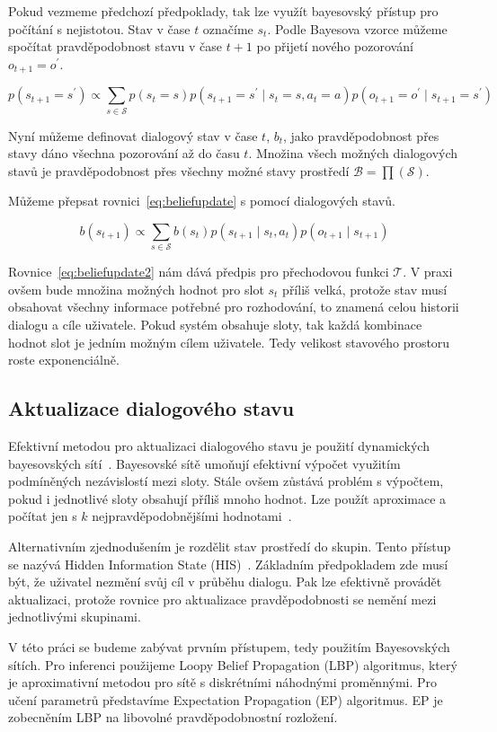 Pokud vezmeme předchozí předpoklady, tak lze využít bayesovský přístup pro počítání s nejistotou.
Stav v čase $t$ označíme $s_t$.
Podle Bayesova vzorce můžeme spočítat pravděpodobnost stavu v čase $t+1$ po přijetí nového pozorování $o_{t+1} = o^\prime$.

\begin{equation}
p(s_{t+1} = s^\prime) \propto
    \sum_{s \in \mathcal{S}}
        p(s_t = s)
        p(s_{t+1} = s^\prime \mid s_t = s, a_t = a) p(o_{t+1} = o^\prime \mid s_{t+1} = s^\prime)
\label{eq:beliefupdate}
\end{equation}

Nyní můžeme definovat dialogový stav v čase $t$, $b_t$, jako pravděpodobnost přes stavy dáno všechna pozorování až do času $t$.
Množina všech možných dialogových stavů je pravděpodobnost přes všechny možné stavy prostředí $\mathcal{B} = \prod(\mathcal{S})$.

Můžeme přepsat rovnici~\eqref{eq:beliefupdate} s pomocí dialogových stavů.

\begin{equation}
b(s_{t+1}) \propto
    \sum_{s \in \mathcal{S}}
        b(s_t)
        p(s_{t+1} \mid s_t, a_t)
        p(o_{t+1} \mid s_{t+1})
\label{eq:beliefupdate2}
\end{equation}

Rovnice~\eqref{eq:beliefupdate2} nám dává předpis pro přechodovou funkci $\mathcal{T}$.
V praxi ovšem bude množina možných hodnot pro slot $s_t$ příliš velká, protože stav musí obsahovat všechny informace potřebné pro rozhodování, to znamená celou historii dialogu a cíle uživatele. 
Pokud systém obsahuje sloty, tak každá kombinace hodnot slot je jedním možným cílem uživatele. 
Tedy velikost stavového prostoru roste exponenciálně.

\subsection{Aktualizace dialogového stavu}

Efektivní metodou pro aktualizaci dialogového stavu je použití dynamických bayesovských sítí~\cite{thomson2008bayesian}.
Bayesovské sítě umoňují efektivní výpočet využitím podmíněných nezávislostí mezi sloty.
Stále ovšem zůstává problém s výpočtem, pokud i jednotlivé sloty obsahují příliš mnoho hodnot.
Lze použít aproximace a počítat jen s $k$ nejpravděpodobnějšími hodnotami~\cite{thomson2010bayesian}.

Alternativním zjednodušením je rozdělit stav prostředí do skupin. 
Tento přístup se nazývá Hidden Information State (HIS)~\cite{young2010hidden}.
Základním předpokladem zde musí být, že uživatel nezmění svůj cíl v průběhu dialogu.
Pak lze efektivně provádět aktualizaci, protože rovnice pro aktualizace pravděpodobnosti se nemění mezi jednotlivými skupinami.

V této práci se budeme zabývat prvním přístupem, tedy použitím Bayesovských sítích.
Pro inferenci použijeme Loopy Belief Propagation (LBP) algoritmus, který je aproximativní metodou pro sítě s diskrétními náhodnými proměnnými.
Pro učení parametrů představíme Expectation Propagation (EP) algoritmus.
EP je zobecněním LBP na libovolné pravděpodobnostní rozložení.
